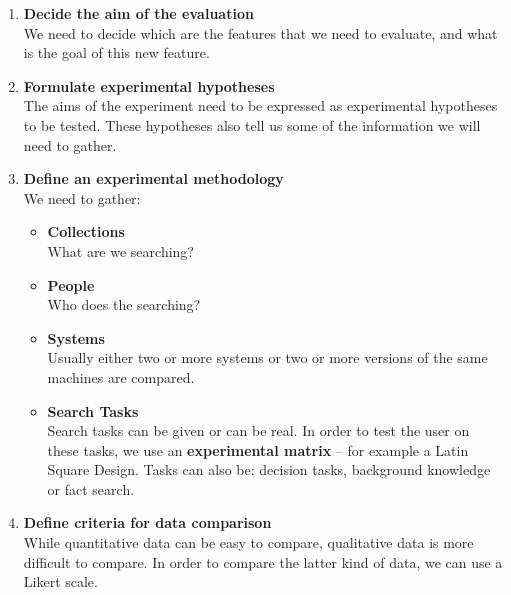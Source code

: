 \documentclass{article}
\begin{document}
\begin{enumerate}
	\item \textbf{Decide the aim of the evaluation}
	\vspace{.2cm} \\
	We need to decide which are the features that we need to evaluate, and what is the goal of this new feature.	
	
	\item \textbf{Formulate experimental hypotheses}
	\vspace{.2cm}\\
	The aims of the experiment need to be expressed as experimental hypotheses to be tested. These hypotheses also tell us some of the information we will need to gather.
	
	\item \textbf{Define an experimental methodology}
	\vspace{.2cm} \\
	We need to gather:
	
	\begin{itemize}
		\item \textbf{Collections}
		\vspace{.2cm} \\
		What are we searching?
		
		\item \textbf{People}
		\vspace{.2cm} \\
		Who does the searching?
		
		\item \textbf{Systems}
		\vspace{.2cm} \\
		Usually either two or more systems or two or more versions of the same machines are compared.
		
		\item \textbf{Search Tasks}
		\vspace{.2cm} \\
		Search tasks can be given or can be real. In order to test the user on these tasks, we use an \textbf{experimental matrix} -- for example a Latin Square Design. Tasks can also be: decision tasks, background knowledge or fact search.
	\end{itemize}
	
	\item \textbf{Define criteria for data comparison}
	\vspace{.2cm} \\
	While quantitative data can be easy to compare, qualitative data is more difficult to compare. In order to compare the latter kind of data, we can use a Likert scale.
	

\end{enumerate}
\end{document}
